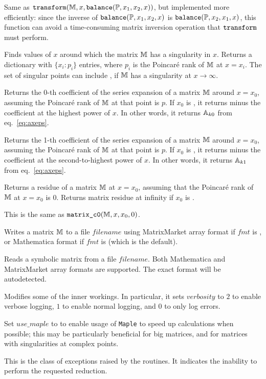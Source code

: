 \documentclass[12pt,a4paper]{article}
\begin{document}
\begin{description}[style=nextline]
Same as $\texttt{transform}(\mathbb{M}, x, \texttt{balance}(\mathbb{P}, x_1, x_2, x))$, but implemented more efficiently: since the inverse of $\texttt{balance}(\mathbb{P}, x_1, x_2, x)$ is $\texttt{balance}(\mathbb{P}, x_2, x_1, x)$, this function can avoid a time-consuming matrix inversion operation that $\texttt{transform}$ must perform.

Finds values of $x$ around which the matrix $\mathbb{M}$ has a singularity in $x$.
Returns a dictionary with $\{x_i: p_i\}$ entries, where $p_i$ is the Poincar\'e rank of $\mathbb{M}$ at $x=x_i$.
The set of singular points can include , if $\mathbb{M}$ has a singularity at $x\to\infty$.

Returns the 0-th coefficient of the series expansion of a matrix $\mathbb{M}$ around $x=x_0$, assuming the Poincar\'e rank of $\mathbb{M}$ at that point is $p$.
If $x_0$ is , it returns minus the coefficient at the highest power of $x$.
In other words, it returns $\mathbb{A}_{k0}$ from eq.~\eqref{eq:axeps}.

Returns the 1-th coefficient of the series expansion of a matrix $\mathbb{M}$ around $x=x_0$, assuming the Poincar\'e rank of $\mathbb{M}$ at that point is $p$.
If $x_0$ is , it returns minus the coefficient at the second-to-highest power of $x$.
In other words, it returns $\mathbb{A}_{k1}$ from eq.~\eqref{eq:axeps}.

Returns a residue of a matrix $\mathbb{M}$ at $x=x_0$, assuming that the Poincar\'e rank of $\mathbb{M}$ at $x=x_0$ is $0$.
Returns matrix residue at infinity if $x_0$ is .

This is the same as $\texttt{matrix\_c0}(\mathbb{M}, x, x_0, 0)$.

Writes a matrix $\mathbb{M}$ to a file $filename$ using MatrixMarket array format if $fmt$ is , or Mathematica format if $fmt$ is  (which is the default).

Reads a symbolic matrix from a file $filename$.
Both Mathematica and MatrixMarket array formats are supported.
The exact format will be autodetected.

Modifies some of the \fuchsia inner workings.
In particular, it sets $verbosity$ to $2$ to enable verbose logging, $1$ to enable normal logging, and $0$ to only log errors.

Set $use\_maple$ to  to enable usage of \texttt{Maple} to speed up calculations when possible; this may be particularly beneficial for big matrices, and for matrices with singularities at complex points.

This is the class of exceptions raised by the \fuchsia routines.
It indicates the inability to perform the requested reduction. 

\end{description}
\end{document}
